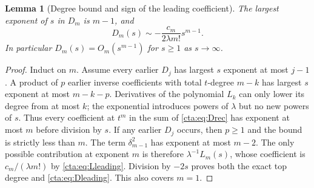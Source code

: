 \documentclass[11pt]{article}
\newtheorem{lemma}[theorem]{Lemma}
\theoremstyle{definition}
\theoremstyle{remark}
\newcommand{\la}{\lambda}
\begin{document}
\begin{lemma}[Degree bound and sign of the leading coefficient]\label{cta:lem:Ddegree}
The largest exponent of $s$ in $D_m$ is $m-1$, and
\begin{equation}\label{cta:eq:Dleading}
 D_m(s)\sim-\frac{c_m}{2\la m!}s^{m-1}.
\end{equation}
In particular $D_m(s)=O_m(s^{m-1})$ for $s\geq1$ as $s\to\infty$.
\end{lemma}
\begin{proof}
Induct on $m$. Assume every earlier $D_j$ has largest $s$ exponent at most
$j-1$. A product of $p$ earlier inverse coefficients with total $t$-degree
$m-k$ has largest $s$ exponent at most $m-k-p$. Derivatives of the polynomial
$L_k$ can only lower its degree from at most $k$; the exponential introduces
powers of $\la$ but no new powers of $s$. Thus every coefficient at
$t^m$ in the sum of \eqref{cta:eq:Drec} has exponent at most $m$ before division
by $s$. If any earlier $D_j$ occurs, then $p\geq1$ and the bound is
strictly less than $m$. The term $\delta_{m-1}^2$ has exponent at most
$m-2$. The only possible contribution at exponent $m$ is therefore
$\la^{-1}L_m(s)$, whose coefficient is $c_m/(\la m!)$ by
\eqref{cta:eq:Lleading}. Division by $-2s$ proves both the exact top degree
and \eqref{cta:eq:Dleading}. This also covers $m=1$.
\end{proof}
\end{document}
